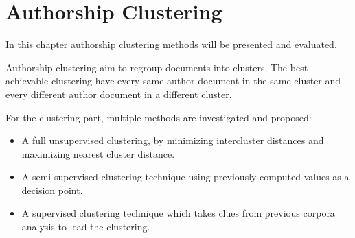 \section{Authorship Clustering \label{sec:clustering}}

In this chapter authorship clustering methods will be presented and evaluated.

Authorship clustering aim to regroup documents into clusters.
The best achievable clustering have every same author document in the same cluster and every different author document in a different cluster.

For the clustering part, multiple methods are investigated and proposed:
\begin{itemize}
  \item
  A full unsupervised clustering, by minimizing intercluster distances and maximizing nearest cluster distance.
  \item
  A semi-supervised clustering technique using previously computed values as a decision point.
  \item
  A supervised clustering technique which takes clues from previous corpora analysis to lead the clustering.
\end{itemize}






